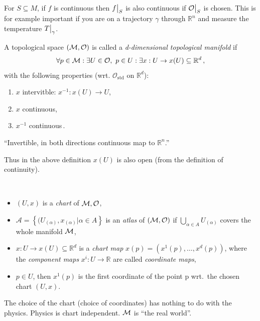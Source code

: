 \documentclass[11pt, a4paper, twocolumn]{article} %
\begin{document}
\begin{note}
    For $S \subseteq M$, if $f$ is continuous then $f\big|_{S}$ is also
    continuous if $\mathcal{O}\big|_S$ is chosen. This is for example important
    if you are on a trajectory $\gamma$ through $\mathbb{R}^n$ and measure the temperature
    $T\big|_\gamma$.
\end{note}

\begin{defn}
    A topological space $(\mathcal{M}, \mathcal{O})$ is called a \textit{d-dimensional topological manifold}
    if
    \begin{equation}
        \forall p \in \mathcal{M}: \exists U \in \mathcal{O},~p\in U: \exists x: U\to x(U)\subseteq \mathbb{R}^{d}
        \,,
    \end{equation}
    with the following properties (wrt. $\mathcal O_\text{std}$ on $\mathbb{R}^{d}$):
    \begin{enumerate}
        \item $x$ intervitble: $x^{-1} : x(U) \to U$,
        \item $x$ continuous,
        \item $x^{-1}$ continuous\,.
    \end{enumerate}
    ``Invertible, in both directions continuous map to $\mathbb{R}^{n}$.''
\end{defn}

\begin{note}
    Thus in the above definition $x(U)$ is also open (from the definition of continuity).
\end{note}

\begin{terminology}~\\
    \begin{itemize}
        \item $(U,x)$ is a \textit{chart} of $\mathcal{M}, \mathcal{O}$,
        \item $\mathcal{A} = \left\{ (U_{(\alpha)}, x_{(\alpha)} | \alpha \in A \right\}$ is an \textit{atlas} of $(\mathcal{M}, \mathcal{O})$ if $\bigcup\limits_{\alpha\in A} U_{(\alpha)}$ covers the whole manifold $\mathcal{M}$,
        \item $x: U \to x(U) \subseteq \mathbb{R}^{d}$ is a \textit{chart map} 
            $x(p) = (x^1(p), \dots, x^d(p))$, where the \textit{component maps} $x^i: U\to\mathbb{R}$ are called \textit{coordinate maps},
        \item $p \in U$, then $x^1(p)$ is the first coordinate of the point p wrt.\ the chosen chart $(U, x)$.
    \end{itemize}
\end{terminology}
\begin{note}
    The choice of the chart (choice of coordinates) has nothing to do with the physics.
    Physics is chart independent. $\mathcal{M}$ is ``the real world''.
\end{note}
\end{document}
